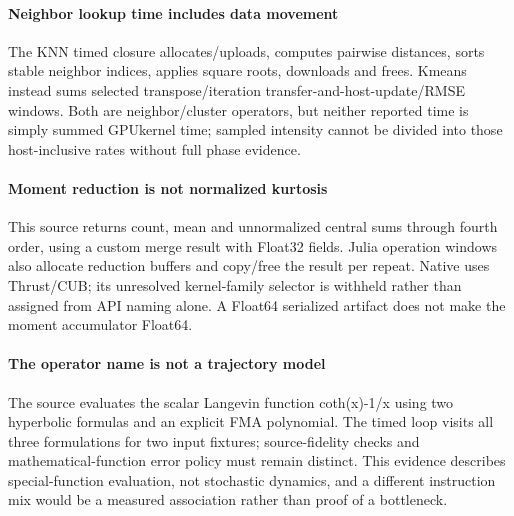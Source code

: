 \paragraph{Neighbor lookup time includes data movement} The KNN timed closure allocates/uploads, computes pairwise distances, sorts stable neighbor indices, applies square roots, downloads and frees. Kmeans instead sums selected transpose/iteration transfer-and-host-update/RMSE windows. Both are neighbor/cluster operators, but neither reported time is simply summed GPUkernel time; sampled intensity cannot be divided into those host-inclusive rates without full phase evidence.

\paragraph{Moment reduction is not normalized kurtosis} This source returns count, mean and unnormalized central sums through fourth order, using a custom merge result with Float32 fields. Julia operation windows also allocate reduction buffers and copy/free the result per repeat. Native uses Thrust/CUB; its unresolved kernel-family selector is withheld rather than assigned from API naming alone. A Float64 serialized artifact does not make the moment accumulator Float64.

\paragraph{The operator name is not a trajectory model} The source evaluates the scalar Langevin function coth(x)-1/x using two hyperbolic formulas and an explicit FMA polynomial. The timed loop visits all three formulations for two input fixtures; source-fidelity checks and mathematical-function error policy must remain distinct. This evidence describes special-function evaluation, not stochastic dynamics, and a different instruction mix would be a measured association rather than proof of a bottleneck.
